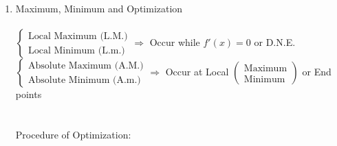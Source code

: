 \documentclass[12px]{article}
\begin{document}
\begin{enumerate}
\begin{enumerate}[(1)]
\begin{enumerate}
            \item Maximum, Minimum and Optimization\\
            \\
            $\left\{
            \begin{aligned}
                    \text{Local Maximum\ (L.M.)}\\
                    \text{Local Minimum\ (L.m.)} 
                \end{aligned}
            \right. \Rightarrow$ Occur while $f'(x)=0$ or D.N.E.\\
            $\left\{
            \begin{aligned}
                    \text{Absolute Maximum\ (A.M.)}\\
                    \text{Absolute Minimum\ (A.m.)} 
                \end{aligned}
            \right. \Rightarrow$ Occur at Local 
            $\left( \begin{aligned}
                \text{Maximum}\\
                \text{Minimum}
            \end{aligned}\right)$
            or End points\\
            \\
            \\
            Procedure of Optimization:
        \end{enumerate}
    \end{enumerate}
\end{enumerate}
\end{document}
